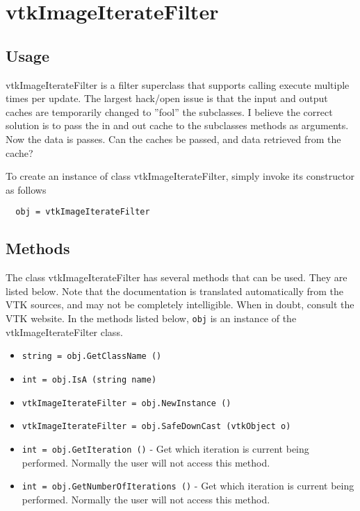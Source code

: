 \section{vtkImageIterateFilter}

\subsection{Usage}

 vtkImageIterateFilter is a filter superclass that supports calling execute
 multiple times per update.  The largest hack/open issue is that the input
 and output caches are temporarily changed to ''fool'' the subclasses.  I
 believe the correct solution is to pass the in and out cache to the
 subclasses methods as arguments.  Now the data is passes.  Can the caches
 be passed, and data retrieved from the cache? 

To create an instance of class vtkImageIterateFilter, simply
invoke its constructor as follows
\begin{verbatim}
  obj = vtkImageIterateFilter
\end{verbatim}
\subsection{Methods}

The class vtkImageIterateFilter has several methods that can be used.
  They are listed below.
Note that the documentation is translated automatically from the VTK sources,
and may not be completely intelligible.  When in doubt, consult the VTK website.
In the methods listed below, \verb|obj| is an instance of the vtkImageIterateFilter class.
\begin{itemize}
\item  \verb|string = obj.GetClassName ()|

\item  \verb|int = obj.IsA (string name)|

\item  \verb|vtkImageIterateFilter = obj.NewInstance ()|

\item  \verb|vtkImageIterateFilter = obj.SafeDownCast (vtkObject o)|

\item  \verb|int = obj.GetIteration ()| -  Get which iteration is current being performed. Normally the
 user will not access this method.

\item  \verb|int = obj.GetNumberOfIterations ()| -  Get which iteration is current being performed. Normally the
 user will not access this method.

\end{itemize}
